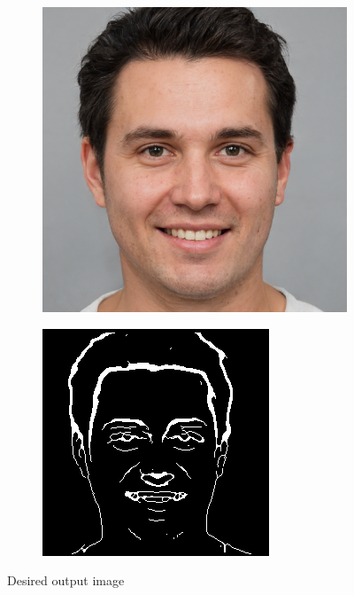 \documentclass{70_styles/svproc}
\begin{document}
\begin{figure}
     \centering
     \begin{subfigure}[b]{0.2\textwidth}
         \centering
         \includegraphics[width=\textwidth]{70_figures/seed0270.png}
     \end{subfigure}
     \begin{subfigure}[b]{0.2\textwidth}
         \centering
         \includegraphics[width=\textwidth]{70_figures/seed0270_EM.png}
     \end{subfigure}
     \caption{Desired output image}
\end{figure}
\end{document}
